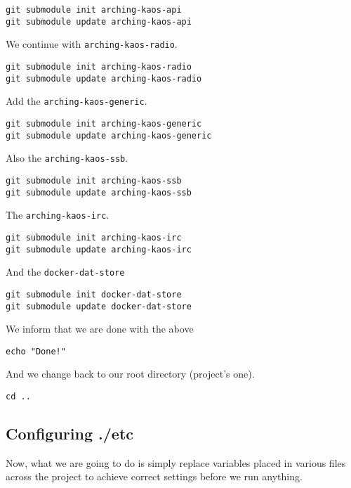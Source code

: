 \documentclass[12pt]{report}
\begin{document}
\begin{verbatim}
git submodule init arching-kaos-api
git submodule update arching-kaos-api
\end{verbatim}

We continue with \texttt{arching-kaos-radio}.

\begin{verbatim}
git submodule init arching-kaos-radio
git submodule update arching-kaos-radio
\end{verbatim}

Add the \texttt{arching-kaos-generic}.

\begin{verbatim}
git submodule init arching-kaos-generic
git submodule update arching-kaos-generic
\end{verbatim}

Also the \texttt{arching-kaos-ssb}.

\begin{verbatim}
git submodule init arching-kaos-ssb
git submodule update arching-kaos-ssb
\end{verbatim}

The \texttt{arching-kaos-irc}.

\begin{verbatim}
git submodule init arching-kaos-irc
git submodule update arching-kaos-irc
\end{verbatim}

And the \texttt{docker-dat-store}

\begin{verbatim}
git submodule init docker-dat-store
git submodule update docker-dat-store
\end{verbatim}

We inform that we are done with the above

\begin{verbatim}
echo "Done!"
\end{verbatim}

And we change back to our root directory (project's one).

\begin{verbatim}
cd ..
\end{verbatim}


\subsection{Configuring ./etc}\label{configuring-.etc}

Now, what we are going to do is simply replace variables placed in
various files across the project to achieve correct settings before we
run anything.
\end{document}
